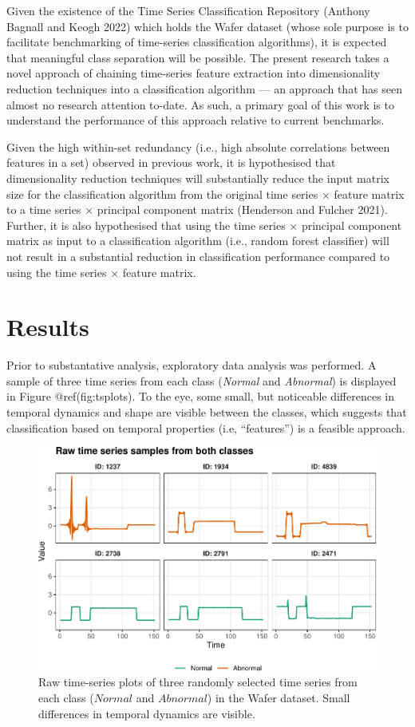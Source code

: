 \documentclass{article}
\begin{document}
Given the existence of the Time Series Classification Repository
(Anthony Bagnall and Keogh 2022) which holds the Wafer dataset (whose
sole purpose is to facilitate benchmarking of time-series classification
algorithms), it is expected that meaningful class separation will be
possible. The present research takes a novel approach of chaining
time-series feature extraction into dimensionality reduction techniques
into a classification algorithm --- an approach that has seen almost no
research attention to-date. As such, a primary goal of this work is to
understand the performance of this approach relative to current
benchmarks.

Given the high within-set redundancy (i.e., high absolute correlations
between features in a set) observed in previous work, it is hypothesised
that dimensionality reduction techniques will substantially reduce the
input matrix size for the classification algorithm from the original
time series \(\times\) feature matrix to a time series \(\times\)
principal component matrix (Henderson and Fulcher 2021). Further, it is
also hypothesised that using the time series \(\times\) principal
component matrix as input to a classification algorithm (i.e., random
forest classifier) will not result in a substantial reduction in
classification performance compared to using the time series \(\times\)
feature matrix.

\hypertarget{results}{%
\section{Results}\label{results}}

Prior to substantative analysis, exploratory data analysis was
performed. A sample of three time series from each class (\emph{Normal}
and \emph{Abnormal}) is displayed in Figure @ref(fig:tsplots). To the
eye, some small, but noticeable differences in temporal dynamics and
shape are visible between the classes, which suggests that
classification based on temporal properties (i.e, ``features'') is a
feasible approach.

\begin{figure}
\centering
\includegraphics{olet5610_report_files/figure-latex/tsplots-1.pdf}
\caption{Raw time-series plots of three randomly selected time series
from each class (\(Normal\) and \(Abnormal\)) in the Wafer dataset.
Small differences in temporal dynamics are visible.}
\end{figure}
\end{document}

